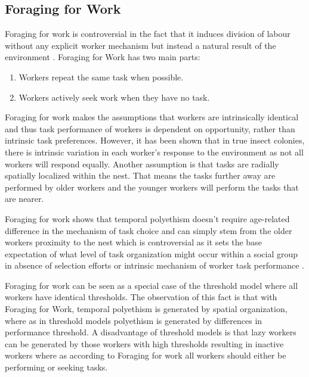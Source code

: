
\subsection{Foraging for Work}

Foraging for work is controversial in the fact that it induces division of labour without any explicit worker mechanism but instead a natural result of the environment \cite{beshers2001models}.  
Foraging for Work has two main parts:
\begin{enumerate}
	\item Workers repeat the same task when possible.
	\item Workers actively seek work when they have no task.
\end{enumerate}


Foraging for work makes the assumptions that workers are intrinsically identical and thus task performance of workers is dependent on opportunity, rather than intrinsic task preferences. However, it has been shown that in true insect colonies, there is intrinsic variation in each worker's response to the environment as not all workers will respond equally. Another assumption is that tasks are radially spatially localized within the nest. That means the tasks further away are performed by older workers and the younger workers will perform the tasks that are nearer.

Foraging for work shows that temporal polyethism doesn't require age-related difference in the mechanism of task choice and can simply stem from the older workers proximity to the nest which is controversial as it sets the base expectation of what level of task organization might occur within a social group in absence of selection efforts or intrinsic mechanism of worker task performance \cite{franks1994foraging}.

Foraging for work can be seen as a special case of the threshold model where all workers have identical thresholds. The observation of this fact is that with Foraging for Work, temporal polyethism is generated by spatial organization, where as in threshold models polyethism is generated by differences in performance threshold. A disadvantage of threshold models is that lazy workers can be generated by those workers with high thresholds resulting in inactive workers where as according to Foraging for work all workers should either be performing or seeking tasks.

